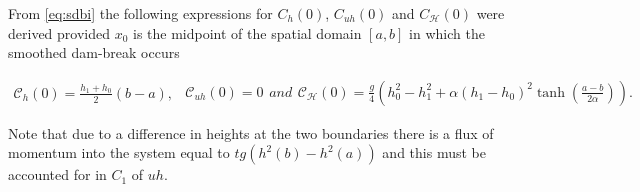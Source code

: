 \documentclass[SingleSpace,12pt,Proceedings]{Serre_ASCE}
\begin{document}
From \eqref{eq:sdbi} the following expressions for $C_{h}(0)$, $C_{uh}(0)$ and $C_{\mathcal{H}}(0)$ were derived provided $x_0$ is the midpoint of the spatial domain $\left[a,b \right]$ in which the smoothed dam-break occurs
\begin{linenomath*}
	\begin{subequations}
	\begin{gather*}
	\mathcal{C}_{h}(0) = \frac{h_1 + h_0}{2}\left(b- a\right),
	\label{eq:Chdef}
	\end{gather*}
	\begin{gather*}
	\mathcal{C}_{uh}(0) = 0
	\label{eq:Cuhdef}
	\end{gather*}
		and
	\begin{gather*}
	\mathcal{C}_{\mathcal{H}}(0) = \frac{g}{4} \left(h_0^2 - h_1^2 + \alpha\left(h_1 - h_0\right)^2\tanh\left(\frac{a - b}{2 \alpha}\right)\right).
	\label{eq:CHdef}
	\end{gather*}
		\label{eq:Canalyticvalues}	
	\end{subequations}
\end{linenomath*}
Note that due to a difference in heights at the two boundaries there is a flux of momentum into the system equal to $tg\left(h^2(b) - h^2(a)\right)$ and this must be accounted for in $C_1$ of $uh$.
\end{document}

